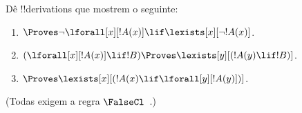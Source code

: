 \documentclass[../../../include/open-logic-section]{subfiles}
\begin{document}
\begin{prob}
Dê !!{derivation}s que mostrem o seguinte:
\begin{enumerate}
\item $\Proves \lnot\lforall[x][!A(x)] \lif \lexists[x][\lnot!A(x)]$.
\item $(\lforall[x][!A(x)] \lif !B) \Proves \lexists[y][(!A(y) \lif !B)]$.
\item $\Proves \lexists[x][(!A(x) \lif \lforall[y][!A(y)])]$.
\end{enumerate}
(Todas exigem a regra $\FalseCl$~.)
\end{prob}
\end{document}

